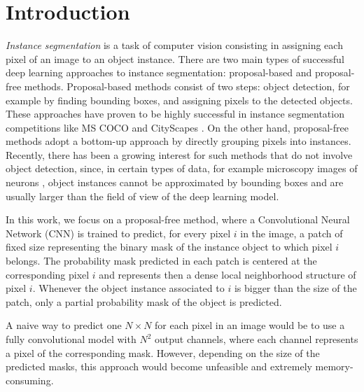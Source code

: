 
\section{Introduction}

\emph{Instance segmentation} is a task of computer vision consisting in assigning each pixel of an image to an object instance. %
There are two main types of successful deep learning approaches to instance segmentation: proposal-based and proposal-free methods. 
Proposal-based methods consist of two steps: object detection, for example by finding bounding boxes, and assigning pixels to the detected objects. These approaches have proven to be highly successful in instance segmentation competitions like MS COCO \cite{lin2014microsoft} and CityScapes \cite{cordts2016cityscapes}. 
On the other hand, proposal-free methods adopt a bottom-up approach by directly grouping pixels into instances. Recently, there has been a growing interest for such methods that do not involve object detection, since, in certain types of data, for example microscopy images of neurons \cite{arganda2015crowdsourcing}, object instances cannot be approximated by bounding boxes and are usually larger than the field of view of the deep learning model. 

In this work, we focus on a proposal-free method, where a Convolutional Neural Network (CNN) is trained to predict, for every pixel $i$ in the image, a patch of fixed size representing the binary mask of the instance object to which pixel $i$ belongs. The probability mask predicted in each patch is centered at the corresponding pixel $i$ and represents then a dense local neighborhood structure of pixel $i$. Whenever the object instance associated to $i$ is bigger than the size of the patch, only a partial probability mask of the object is predicted. 

A naive way to predict one $N\times N$ \patch  for each pixel in an image would be to use a fully convolutional model with $N^2$ output channels, where each channel represents a pixel of the corresponding mask. However, depending on the size of the predicted masks, this approach would become unfeasible and extremely memory-consuming.


